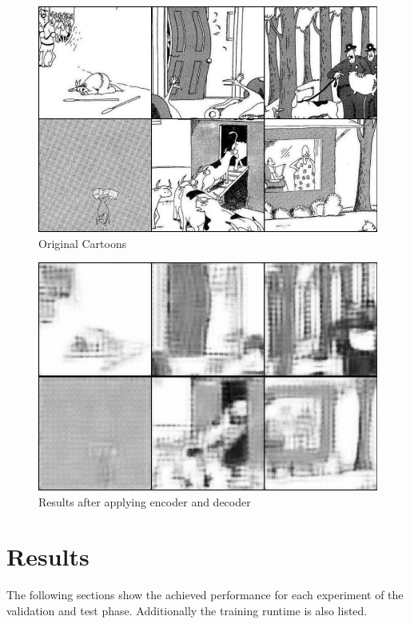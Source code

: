 \documentclass[draft,final,oneside]{vutinfth} %
\begin{document}
\begin{figure}
	\centering
  	\includegraphics[width=1.0\textwidth]{graphics/autoencoder_original.png}
	\caption{Original Cartoons}
	\label{fig:autoencoderimageoriginal}
\end{figure}

\begin{figure}
	\centering
  	\includegraphics[width=1.0\textwidth]{graphics/autoencoder_final.png}
	\caption{Results after applying encoder and decoder}
	\label{fig:autoencoderresults}
\end{figure}

\section{Results}

The following sections show the achieved performance for each experiment of the validation
and test phase. Additionally the training runtime is also listed.
\end{document}
